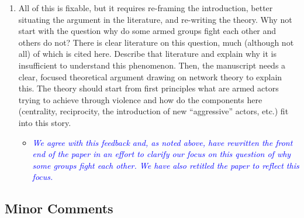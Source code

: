 \begin{enumerate}
	\begin{itemize}
		\item \textcolor{blue}{ \emph{
		We have now re-written the introduction and the theory sections. First, we hope that our introduction is much clearer and orients the paper around the question ``who fights who and when"? We illuminate this puzzle through providing anecdotes about different multi-actor conflicts in our new introduction. Our theory section is now rooted in contributions from prior research on the attributes and motivations of armed actors. Such a focus allows us to then explain how a network approach flows from the findings of preexisting research. Each network concept used in the theory is now situated within the related literature on conflict processes, which allows us to defend our position that the interactions between actors, not just actor attributes, more accurately explains the occurrence of violence between armed groups. We also believe the reworking of our theory now brings it closer in line with our empirical application and focus on battles between armed actors.
		}}
	\end{itemize}	
	\item All of this is fixable, but it requires re-framing the introduction, better situating the argument in the literature, and re-writing the theory. Why not start with the question why do some armed groups fight each other and others do not? There is clear literature on this question, much (although not all) of which is cited here. Describe that literature and explain why it is insufficient to understand this phenomenon. Then, the manuscript needs a clear, focused theoretical argument drawing on network theory to explain this. The theory should start from first principles what are armed actors trying to achieve through violence and how do the components here (centrality, reciprocity, the introduction of new ``aggressive'' actors, etc.) fit into this story.	
	\begin{itemize}
		\item \textcolor{blue}{ \emph{
		We agree with this feedback and, as noted above, have rewritten the front end of the paper in an effort to clarify our focus on this question of why some groups fight each other.  We have also retitled the paper to reflect this focus. 
		}}
	\end{itemize}		
\end{enumerate}

\subsection{Minor Comments}

